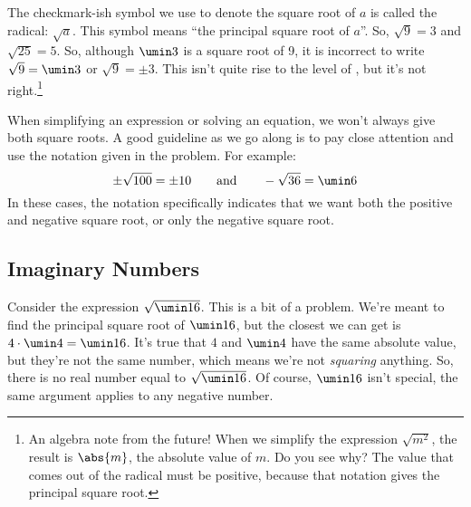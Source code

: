 The checkmark-ish symbol we use to denote the square root of $a$ is called the \gls{radical}: $\sqrt{a}$. This symbol means ``the principal square root of $a$''. So, $\sqrt{9} = 3$ and $\sqrt{25} = 5$. So, although $\umin3$ is a square root of 9, it is incorrect to write $\sqrt{9} = \umin3$ or $\sqrt{9} = \pm3$. This isn't quite rise to the level of \evilandwrong, but it's not right.\footnote{An algebra note from the future! When we simplify the expression $\sqrt{m^2}$, the result is $\abs{m}$, the absolute value of $m$. Do you see why? The value that comes out of the radical must be positive, because that notation gives the principal square root.}

When simplifying an expression or solving an equation, we won't always give both square roots.  A good guideline as we go along is to pay close attention and use the notation given in the problem. For example: \[\pm\sqrt{100} = \pm10 \qquad\text{and}\qquad -\sqrt{36} = \umin6\]
In these cases, the notation specifically indicates that we want both the positive and negative square root, or only the negative square root.

%
%

\subsection{Imaginary Numbers}

Consider the expression $\sqrt{\umin16}$. This is a bit of a problem. We're meant to find the principal square root of $\umin16$, but the closest we can get is $4 \cdot \umin4 = \umin16$. It's true that $4$ and $\umin4$ have the same absolute value, but they're not the same number, which means we're not \textit{squaring} anything. So, there is no real number equal to $\sqrt{\umin16}$. Of course, $\umin16$ isn't special, the same argument applies to any negative number.


